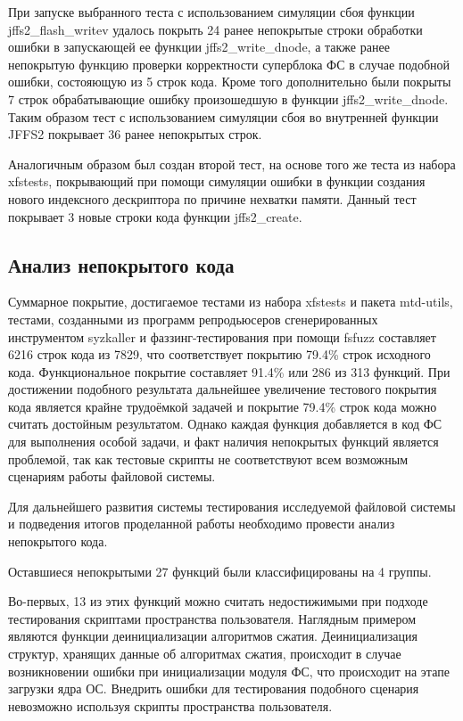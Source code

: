 При запуске выбранного теста с использованием симуляции сбоя функции jffs2\_flash\_writev удалось покрыть 24 ранее непокрытые строки обработки ошибки в запускающей ее функции jffs2\_write\_dnode, а также ранее непокрытую функцию проверки корректности суперблока ФС в случае подобной ошибки, состояющую из 5 строк кода. Кроме того дополнительно были покрыты 7 строк обрабатывающие ошибку произошедшую в функции jffs2\_write\_dnode. Таким образом тест с использованием симуляции сбоя во внутренней функции JFFS2 покрывает 36 ранее непокрытых строк.

Аналогичным образом был создан второй тест, на основе того же теста из набора xfstests, покрывающий при помощи симуляции ошибки в функции создания нового индексного дескриптора по причине нехватки памяти. Данный тест покрывает 3 новые строки кода функции jffs2\_create.

\subsection{Анализ непокрытого кода}

Суммарное покрытие, достигаемое тестами из набора xfstests и пакета mtd-utils, тестами, созданными из программ репродьюсеров сгенерированных инструментом syzkaller и фаззинг-тестирования при помощи fsfuzz составляет 6216 строк кода из 7829, что соответствует покрытию 79.4\% строк исходного кода. Функциональное покрытие составляет 91.4\% или 286 из 313 функций. При достижении подобного результата дальнейшее увеличение тестового покрытия кода является крайне трудоёмкой задачей и покрытие 79.4\% строк кода можно считать достойным результатом. Однако каждая функция добавляется в код ФС для выполнения особой задачи, и факт наличия непокрытых функций является проблемой, так как тестовые скрипты не соответствуют всем возможным сценариям работы файловой системы.

Для дальнейшего развития системы тестирования исследуемой файловой системы и подведения итогов проделанной работы необходимо провести анализ непокрытого кода.

Оставшиеся непокрытыми 27 функций были классифицированы на 4 группы. 

Во-первых, 13 из этих функций можно считать недостижимыми при подходе тестирования скриптами пространства пользователя. Наглядным примером являются функции деинициализации алгоритмов сжатия. Деинициализация структур, хранящих данные об алгоритмах сжатия, происходит в случае возникновении ошибки при инициализации модуля ФС, что происходит на этапе загрузки ядра ОС. Внедрить ошибки для тестирования подобного сценария невозможно используя скрипты пространства пользователя.

